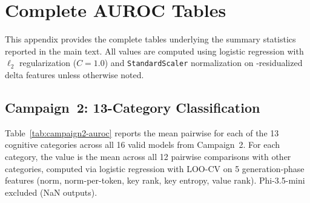 \section{Complete AUROC Tables}
\label{app:auroc-tables}

This appendix provides the complete \auroc tables underlying the summary statistics reported in the main text.
All values are computed using logistic regression with $\ell_2$ regularization ($C = 1.0$) and \texttt{StandardScaler} normalization on \fwl-residualized delta features unless otherwise noted.

\subsection{Campaign~2: 13-Category Classification}
\label{app:campaign2-auroc}

Table~\ref{tab:campaign2-auroc} reports the mean pairwise \auroc for each of the 13 cognitive categories across all 16 valid models from Campaign~2.
For each category, the value is the mean \auroc across all 12 pairwise comparisons with other categories, computed via logistic regression with LOO-CV on 5 generation-phase features (norm, norm-per-token, key rank, key entropy, value rank).
Phi-3.5-mini excluded (NaN outputs).

